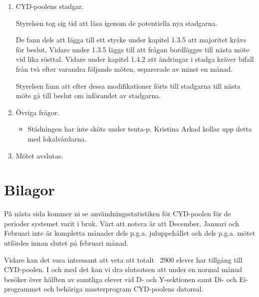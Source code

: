 \documentclass[a4paper,12pt]{article}
\begin{document}
\begin{enumerate}
\item CYD-poolens stadgar.

Styrelsen tog sig tid att läsa igenom de potentiella nya stadgarna.

De fann dels att lägga till ett stycke under kapitel 1.3.5 att majoritet krävs för beslut. Vidare under 1.3.5 läggs till att frågan bordlägges till nästa möte vid lika rösttal. Vidare under kapitel 1.4.2 att ändringar i stadga kräver bifall från två efter varandra följande möten, separerade av minst en månad.

Styrelsen fann att efter dessa modifikationer förts till stadgarna till nästa möte gå till beslut om införandet av stadgarna.

\item Övriga frågor.
  \begin{itemize}
    \item Städningen har inte sköts under tenta-p. Kristina Arkad kollar upp detta med lokalvårdarna.
  \end{itemize}
\item Mötet avslutas.
\end{enumerate}

\section{Bilagor}
På nästa sida kommer ni se användningsstatistiken för CYD-poolen för de perioder systemet varit i bruk. Värt att notera är att December, Januari och Februari inte är kompletta månader dels p.g.a. juluppehållet och dels p.g.a. mötet utfördes innan slutet på februari månad.

Vidare kan det vara intressant att veta att totalt ~2900 elever har tillgång till CYD-poolen. I och med det kan vi dra slutsatsen att under en normal månad besöker över hälften av samtliga elever vid D- och Y-sektionen samt Di- och Ei-programmet och behöriga masterprogram CYD-poolens datorsal.



\end{document}
